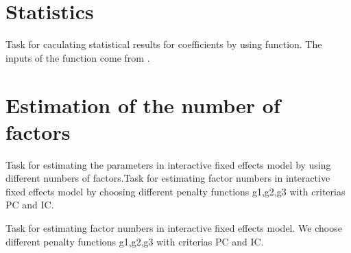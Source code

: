 \documentclass[a4paper,11pt,english]{sphinxmanual}
\begin{document}
\section{Statistics}
\label{\detokenize{analysis:module-src.analysis.task_statistics_coefficient}}\label{\detokenize{analysis:statistics}}
\sphinxAtStartPar
Task for caculating statistical results for coefficients by using 
function. The inputs of the function come from .


\section{Estimation of the number of factors}
\label{\detokenize{analysis:module-src.analysis.task_simulation_factor}}\label{\detokenize{analysis:estimation-of-the-number-of-factors}}
\sphinxAtStartPar
Task for estimating the parameters in interactive fixed effects model by using different
numbers of factors.Task for estimating factor numbers in interactive fixed effects model by choosing
different penalty functions g1,g2,g3 with criterias PC and IC.

\begin{fulllineitems}
\label{\detokenize{analysis:src.analysis.task_simulation_factor.task_factor_estimate_interactive_fixed_effects_model}}
\sphinxAtStartPar
Task for estimating factor numbers in interactive fixed effects model.
We choose different penalty functions g1,g2,g3 with criterias PC and IC.

\end{fulllineitems}
\end{document}

